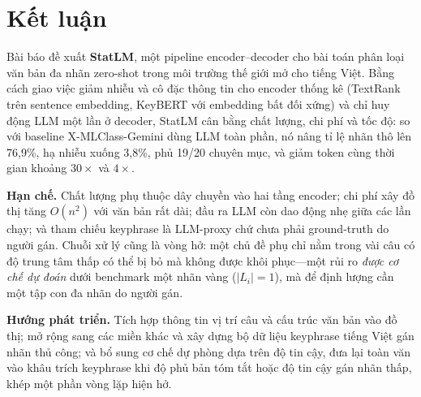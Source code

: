 \section{Kết luận}
Bài báo đề xuất \textbf{StatLM}, một pipeline encoder--decoder cho bài toán phân
loại văn bản đa nhãn zero-shot trong môi trường thế giới mở cho tiếng Việt. Bằng
cách giao việc giảm nhiễu và cô đặc thông tin cho encoder thống kê (TextRank trên
sentence embedding, KeyBERT với embedding bất đối xứng) và chỉ huy động LLM một lần ở
decoder, StatLM cân bằng chất lượng, chi phí và tốc độ: so với baseline X-MLClass-Gemini dùng
LLM toàn phần, nó nâng tỉ lệ nhãn thô lên 76,9\%, hạ nhiễu xuống 3,8\%, phủ 19/20
chuyên mục, và giảm token cùng thời gian khoảng $30\times$ và $4\times$.

\textbf{Hạn chế.} Chất lượng phụ thuộc dây chuyền vào hai tầng encoder; chi phí xây
đồ thị tăng $O(n^2)$ với văn bản rất dài; đầu ra LLM còn dao động nhẹ giữa các lần
chạy; và tham chiếu keyphrase là LLM-proxy chứ chưa phải ground-truth do người gán.
Chuỗi xử lý cũng là vòng hở: một chủ đề phụ chỉ nằm trong vài câu có độ trung tâm
thấp có thể bị bỏ mà không được khôi phục---một rủi ro \emph{được cơ chế dự đoán}
dưới benchmark một nhãn vàng ($|L_i|=1$), mà để định lượng cần một tập con đa nhãn do
người gán.

\textbf{Hướng phát triển.} Tích hợp thông tin vị trí câu và cấu trúc văn bản vào đồ
thị; mở rộng sang các miền khác và xây dựng bộ dữ liệu keyphrase tiếng Việt gán nhãn
thủ công; và bổ sung cơ chế dự phòng dựa trên độ tin cậy, đưa lại toàn văn vào khâu
trích keyphrase khi độ phủ bản tóm tắt hoặc độ tin cậy gán nhãn thấp, khép một phần
vòng lặp hiện hở.

